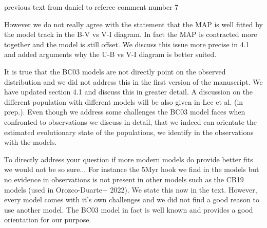 previous text from daniel to referee comment number 7

However we do not really agree with the statement that the MAP is well fitted by the model track in the B-V vs V-I diagram. In fact the MAP is contracted more together and the model is still offset. We discuss this issue more precise in 4.1 and added arguments why the U-B vs V-I diagram is better suited. 


It is true that the BC03 models are not directly point on the observed distribution and we did not address this in the first version of the manuscript. 
We have updated section 4.1 and discuss this in greater detail. A discussion on the different population with different models will be also given in Lee et al. (in prep.). 
Even though we address some challenges the BC03 model faces when confronted to observations we discuss in detail, that we indeed can orientate the estimated evolutionary state of the populations, we identify in the observations with the models. 

To directly address your question if more modern models do provide better fits we would not be so sure... For instance the 5Myr hook we find in the models but no evidence in observations is not present in other models such as the CB19 models (used in Orozco-Duarte+ 2022). We state this now in the text. However, every model comes with it's own challenges and we did not find a good reason to use another model. The BC03 model in fact is well known and provides a good orientation for our purpose.


